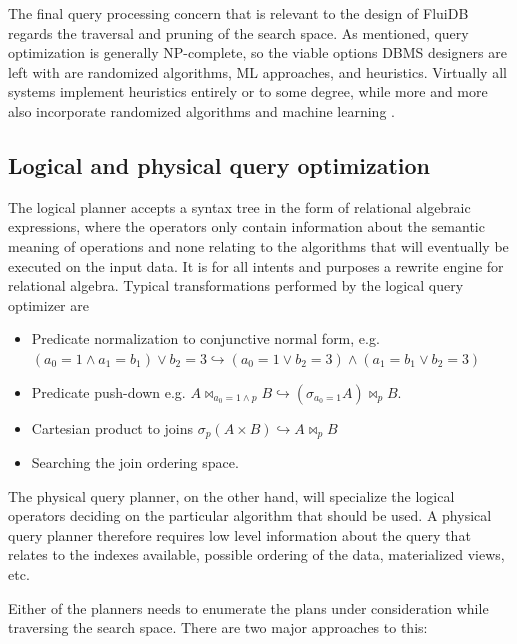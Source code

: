 The final query processing concern that is relevant to the design of
FluiDB regards the traversal and pruning of the search space. As
mentioned, query optimization is generally NP-complete, so the viable
options DBMS designers are left with are randomized algorithms, ML
approaches, and heuristics. Virtually all systems implement heuristics
entirely or to some degree, while more and more also incorporate
randomized algorithms \cite{chandeGeneticOptimizationJoin2011} and
machine learning
\cite{liMachineLearningDatabases2021,marcusNeoLearnedQuery2019}.

\subsection{Logical and physical query optimization}

The logical planner accepts a syntax tree in the form of relational
algebraic expressions, where the operators only contain information
about the semantic meaning of operations and none relating to the
algorithms that will eventually be executed on the input data. It is
for all intents and purposes a rewrite engine for relational
algebra. Typical transformations performed by the logical query
optimizer are

\begin{itemize}
\item Predicate normalization to conjunctive normal form, e.g. \((a_0 = 1
  \land a_1 = b_1) \lor b_2 = 3 \hookrightarrow (a_0 = 1 \lor b_2 = 3)
  \land (a_1 = b_1 \lor b_2 = 3)\)
\item Predicate push-down e.g. \(A \Join_{a_0 = 1 \land p} B
  \hookrightarrow (\sigma_{a_0 = 1} A) \Join_p B\).
\item Cartesian product to joins \(\sigma_p ( A \times B )
  \hookrightarrow A \Join_p B\)
\item Searching the join ordering space.
\end{itemize}

The physical query planner, on the other hand, will specialize the
logical operators deciding on the particular algorithm that should be
used. A physical query planner therefore requires low level
information about the query that relates to the indexes available,
possible ordering of the data, materialized views, etc.

Either of the planners needs to enumerate the plans under
consideration while traversing the search space. There are two major
approaches to this:


